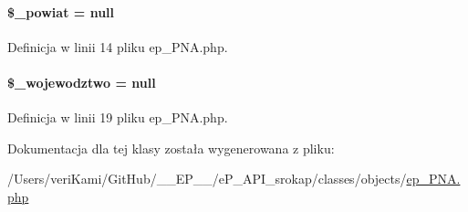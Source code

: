\hypertarget{classep___p_n_a_a928275f8378baade592a64f89da229ef}{
\paragraph[{\$\-\_\-powiat}]{\setlength{\rightskip}{0pt plus 5cm}\$\-\_\-powiat = null\hspace{0.3cm}{\ttfamily [protected]}}}\label{classep___p_n_a_a928275f8378baade592a64f89da229ef}


Definicja w linii 14 pliku ep\-\_\-\-P\-N\-A.\-php.

\hypertarget{classep___p_n_a_a2a0a830e555a9e31b5118be82dbc33c7}{
\paragraph[{\$\-\_\-wojewodztwo}]{\setlength{\rightskip}{0pt plus 5cm}\$\-\_\-wojewodztwo = null\hspace{0.3cm}{\ttfamily [protected]}}}\label{classep___p_n_a_a2a0a830e555a9e31b5118be82dbc33c7}


Definicja w linii 19 pliku ep\-\_\-\-P\-N\-A.\-php.



Dokumentacja dla tej klasy została wygenerowana z pliku\-:\begin{DoxyCompactItemize}
\item 
/\-Users/veri\-Kami/\-Git\-Hub/\-\_\-\-\_\-\-E\-P\-\_\-\-\_\-/e\-P\-\_\-\-A\-P\-I\-\_\-srokap/classes/objects/\hyperlink{ep___p_n_a_8php}{ep\-\_\-\-P\-N\-A.\-php}\end{DoxyCompactItemize}
